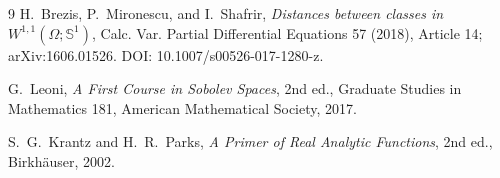 \documentclass[11pt]{article}
\begin{document}
\begin{thebibliography}{9}
H.~Brezis, P.~Mironescu, and I.~Shafrir,
\emph{Distances between classes in $W^{1,1}(\Omega;\mathbb S^1)$},
Calc. Var. Partial Differential Equations 57 (2018), Article 14;
arXiv:1606.01526. DOI: 10.1007/s00526-017-1280-z.

G.~Leoni, \emph{A First Course in Sobolev Spaces}, 2nd ed.,
Graduate Studies in Mathematics 181, American Mathematical Society, 2017.

S.~G.~Krantz and H.~R.~Parks,
\emph{A Primer of Real Analytic Functions}, 2nd ed., Birkh\"auser, 2002.
\end{thebibliography}
\end{document}
